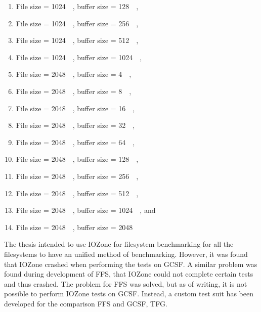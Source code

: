 \begin{enumerate}
\begin{enumerate}
	\item File size = \SI{1024}{\kilo\byte}, buffer size = \SI{128}{\kilo\byte},
	\item File size = \SI{1024}{\kilo\byte}, buffer size = \SI{256}{\kilo\byte},
	\item File size = \SI{1024}{\kilo\byte}, buffer size = \SI{512}{\kilo\byte},
	\item File size = \SI{1024}{\kilo\byte}, buffer size = \SI{1024}{\kilo\byte},
	\item File size = \SI{2048}{\kilo\byte}, buffer size = \SI{4}{\kilo\byte},
	\item File size = \SI{2048}{\kilo\byte}, buffer size = \SI{8}{\kilo\byte},
	\item File size = \SI{2048}{\kilo\byte}, buffer size = \SI{16}{\kilo\byte},
	\item File size = \SI{2048}{\kilo\byte}, buffer size = \SI{32}{\kilo\byte},
	\item File size = \SI{2048}{\kilo\byte}, buffer size = \SI{64}{\kilo\byte},
	\item File size = \SI{2048}{\kilo\byte}, buffer size = \SI{128}{\kilo\byte},
	\item File size = \SI{2048}{\kilo\byte}, buffer size = \SI{256}{\kilo\byte},
	\item File size = \SI{2048}{\kilo\byte}, buffer size = \SI{512}{\kilo\byte},
	\item File size = \SI{2048}{\kilo\byte}, buffer size = \SI{1024}{\kilo\byte}, and
	\item File size = \SI{2048}{\kilo\byte}, buffer size = \SI{2048}{\kilo\byte}
\end{enumerate}

The thesis intended to use IOZone for filesystem benchmarking for all the filesystems to have an unified method of benchmarking. However, it was found that IOZone crashed when performing the tests on GCSF. A similar problem was found during development of FFS, that IOZone could not complete certain tests and thus crashed. The problem for FFS was solved, but as of writing, it is not possible to perform IOZone tests on GCSF. Instead, a custom test suit has been developed for the comparison FFS and GCSF, TFG. 



\end{enumerate}
